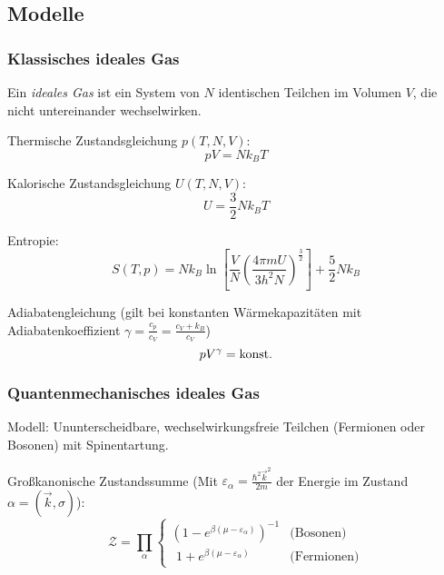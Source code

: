 \documentclass[11pt]{article}
\numberwithin{equation}{section}
\begin{document}
		\subsection{Modelle}
			\subsubsection{Klassisches ideales Gas}
				\noindent
				Ein \emph{ideales Gas} ist ein System von $N$ identischen Teilchen im Volumen $V$, die nicht untereinander wechselwirken. \vsp

				\noindent
				Thermische Zustandsgleichung $p(T, N, V)$:
				\begin{equation}
					pV = N k_B T
				\end{equation}

				\noindent
				Kalorische Zustandsgleichung $U(T, N, V)$:
				\begin{equation}
					U = \frac{3}{2} N k_B T
				\end{equation}

				\noindent
				Entropie:
				\begin{equation}
					S(T,p) = N k_B \ln{\left[ \frac{V}{N}\left( \frac{4\pi m	U}{3 h^2 N} \right)^{\frac{3}{2}} \right]} + \frac{5}{2} N k_B
				\end{equation}

				\noindent
				Adiabatengleichung \newline(gilt bei konstanten Wärmekapazitäten mit Adiabatenkoeffizient $\gamma = \frac{c_p}{c_V} = \frac{c_V + k_B}{c_V}$)
				\begin{equation}
					p V^\gamma = \mathrm{konst.}
				\end{equation}

			\subsubsection{Quantenmechanisches ideales Gas}
				\noindent
				Modell: Ununterscheidbare, wechselwirkungsfreie Teilchen (Fermionen oder Bosonen) mit Spinentartung. \vsp

				\noindent
				Großkanonische Zustandssumme (Mit $\varepsilon_\alpha = \frac{\hbar^2 \vec{k}^2}{2m}$ der Energie im Zustand $\alpha=(\vec{k},\sigma)$):
				\begin{equation}
					\mathcal{Z} = \prod_{\alpha}
						\begin{cases}
							\left( 1-e^{\beta(\mu-\varepsilon_\alpha)}\right)^{-1} & \text{(Bosonen)} \\
							\phantom{\big(} 1+e^{\beta(\mu-\varepsilon_\alpha)} & \text{(Fermionen)}
						\end{cases}
				\end{equation}
\end{document}

